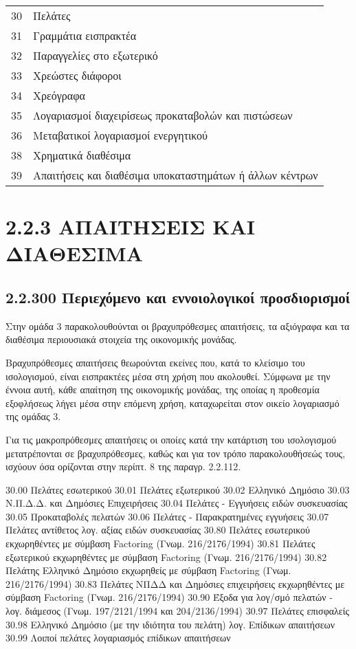 \documentclass[A4,10pt,greek]{book}
\begin{document}
\begin{tabularx}{\linewidth}{lX}

30 & Πελάτες\\
31 & Γραμμάτια εισπρακτέα\\
32 & Παραγγελίες στο εξωτερικό\\
33 & Χρεώστες διάφοροι\\
34 & Χρεόγραφα\\
35 & Λογαριασμοί διαχειρίσεως προκαταβολών και πιστώσεων\\
36 & Μεταβατικοί λογαριασμοί ενεργητικού\\
38 & Χρηματικά διαθέσιμα\\
39 & Απαιτήσεις και διαθέσιμα υποκαταστημάτων ή άλλων κέντρων\\

\end{tabularx}

\section {2.2.3 ΑΠΑΙΤΗΣΕΙΣ ΚΑΙ ΔΙΑΘΕΣΙΜΑ}

\subsection{2.2.300 Περιεχόμενο και εννοιολογικοί προσδιορισμοί}

Στην ομάδα 3 παρακολουθούνται οι βραχυπρόθεσμες απαιτήσεις, τα αξιόγραφα και τα διαθέσιμα περιουσιακά στοιχεία της οικονομικής μονάδας.

Βραχυπρόθεσμες απαιτήσεις θεωρούνται εκείνες που, κατά το κλείσιμο του ισολογισμού, είναι εισπρακτέες μέσα στη χρήση που ακολουθεί. Σύμφωνα με την έννοια αυτή, κάθε απαίτηση της οικονομικής μονάδας, της οποίας η προθεσμία εξοφλήσεως λήγει μέσα στην επόμενη χρήση, καταχωρείται στον οικείο λογαριασμό της ομάδας 3.

Για τις μακροπρόθεσμες απαιτήσεις οι οποίες κατά την κατάρτιση του ισολογισμού μετατρέπονται σε βραχυπρόθεσμες, καθώς και για τον τρόπο παρακολουθήσεώς τους, ισχύουν όσα ορίζονται στην περίπτ. 8 της παραγρ.  2.2.112.

30.00   Πελάτες εσωτερικού
30.01   Πελάτες εξωτερικού
30.02   Ελληνικό Δημόσιο
30.03   Ν.Π.Δ.Δ. και Δημόσιες Επιχειρήσεις
30.04   Πελάτες - Εγγυήσεις ειδών συσκευασίας
30.05   Προκαταβολές πελατών
30.06   Πελάτες - Παρακρατημένες εγγυήσεις
30.07   Πελάτες αντίθετος λογ. αξίας ειδών συσκευασίας
30.80   Πελάτες εσωτερικού εκχωρηθέντες με σύμβαση Factoring (Γνωμ. 216/2176/1994)
30.81   Πελάτες εξωτερικού εκχωρηθέντες με σύμβαση Factoring (Γνωμ. 216/2176/1994)
30.82   Πελάτης Ελληνικό Δημόσιο εκχωρηθείς με σύμβαση Factoring (Γνωμ. 216/2176/1994)
30.83   Πελάτες ΝΠΔΔ και Δημόσιες επιχειρήσεις εκχωρηθέντες με σύμβαση Factoring (Γνωμ. 216/2176/1994)
30.90   Έξοδα για λογ/σμό πελατών - λογ. διάμεσος (Γνωμ. 197/2121/1994 και 204/2136/1994)
30.97   Πελάτες επισφαλείς
30.98   Ελληνικό Δημόσιο (με την ιδιότητα του πελάτη) λογ. Επίδικων απαιτήσεων
30.99   Λοιποί πελάτες λογαριασμός επίδικων απαιτήσεων
\end{document}
